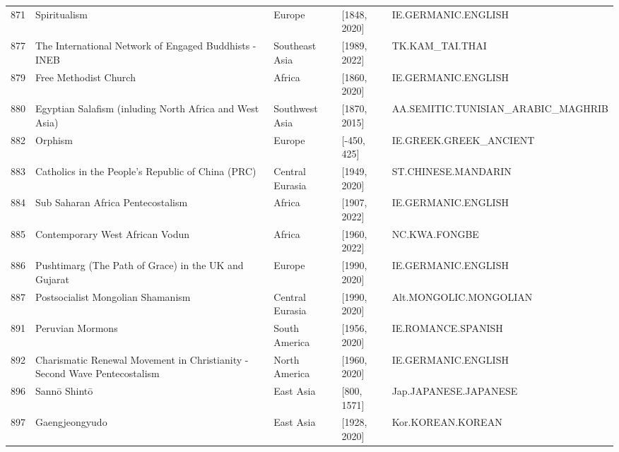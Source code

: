 {\begin{longtable}{rp{3.5cm}llp{3.5cm}}
871 & {\raggedright Spiritualism} & Europe & [1848, 2020] & {\raggedright IE.\allowbreak{}GERMANIC.\allowbreak{}ENGLISH} \\
877 & {\raggedright The International Network of Engaged Buddhists - INEB} & Southeast Asia & [1989, 2022] & {\raggedright TK.\allowbreak{}KAM\_\allowbreak{}TAI.\allowbreak{}THAI} \\
879 & {\raggedright Free Methodist Church} & Africa & [1860, 2020] & {\raggedright IE.\allowbreak{}GERMANIC.\allowbreak{}ENGLISH} \\
880 & {\raggedright Egyptian Salafism (inluding North Africa and West Asia)} & Southwest Asia & [1870, 2015] & {\raggedright AA.\allowbreak{}SEMITIC.\allowbreak{}TUNISIAN\_\allowbreak{}ARABIC\_\allowbreak{}MAGHRIB} \\
882 & {\raggedright Orphism} & Europe & [-450, 425] & {\raggedright IE.\allowbreak{}GREEK.\allowbreak{}GREEK\_\allowbreak{}ANCIENT} \\
883 & {\raggedright Catholics in the People's Republic of China (PRC)} & Central Eurasia & [1949, 2020] & {\raggedright ST.\allowbreak{}CHINESE.\allowbreak{}MANDARIN} \\
884 & {\raggedright Sub Saharan Africa Pentecostalism} & Africa & [1907, 2022] & {\raggedright IE.\allowbreak{}GERMANIC.\allowbreak{}ENGLISH} \\
885 & {\raggedright Contemporary West African Vodun} & Africa & [1960, 2022] & {\raggedright NC.\allowbreak{}KWA.\allowbreak{}FONGBE} \\
886 & {\raggedright Pushtimarg (The Path of Grace) in the UK and Gujarat} & Europe & [1990, 2020] & {\raggedright IE.\allowbreak{}GERMANIC.\allowbreak{}ENGLISH} \\
887 & {\raggedright Postsocialist Mongolian Shamanism} & Central Eurasia & [1990, 2020] & {\raggedright Alt.\allowbreak{}MONGOLIC.\allowbreak{}MONGOLIAN} \\
891 & {\raggedright Peruvian Mormons} & South America & [1956, 2020] & {\raggedright IE.\allowbreak{}ROMANCE.\allowbreak{}SPANISH} \\
892 & {\raggedright Charismatic Renewal Movement in Christianity - Second Wave Pentecostalism} & North America & [1960, 2020] & {\raggedright IE.\allowbreak{}GERMANIC.\allowbreak{}ENGLISH} \\
896 & {\raggedright Sannō Shintō} & East Asia & [800, 1571] & {\raggedright Jap.\allowbreak{}JAPANESE.\allowbreak{}JAPANESE} \\
897 & {\raggedright Gaengjeongyudo} & East Asia & [1928, 2020] & {\raggedright Kor.\allowbreak{}KOREAN.\allowbreak{}KOREAN} \\

\end{longtable}}
